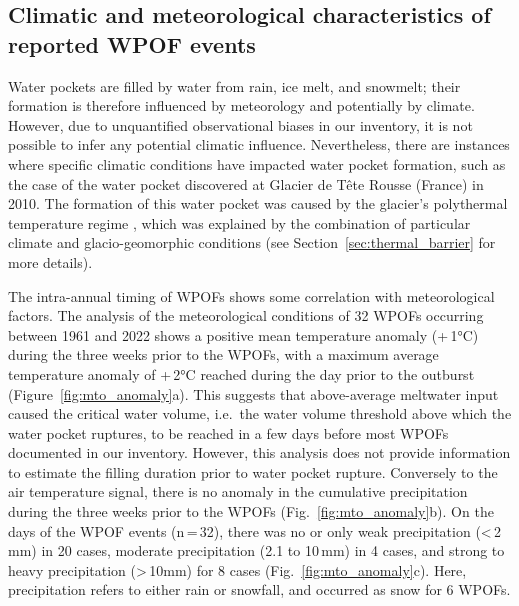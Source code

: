 \subsection{ Climatic and meteorological characteristics of reported WPOF events}
\label{sec:envelop_meteo}

Water pockets are filled by water from rain, ice melt, and snowmelt; their formation is therefore influenced by meteorology and potentially by climate. However, due to unquantified observational biases in our inventory, it is not possible to infer any potential climatic influence. Nevertheless, there are instances where specific climatic conditions have impacted water pocket formation, such as the case of the water pocket discovered at Glacier de Tête Rousse (France) in 2010. The formation of this water pocket was caused by the glacier's polythermal temperature regime \citep{Vincent&al2012}, which was explained by the combination of particular climate and glacio-geomorphic conditions (see Section~\ref{sec:thermal_barrier} for more details).

The intra-annual timing of WPOFs shows some correlation with meteorological factors. The analysis of the meteorological conditions of 32 WPOFs occurring between 1961 and 2022 shows a positive mean temperature anomaly (+\,1°C) during the three weeks prior to the WPOFs, with a maximum average temperature anomaly of +\,2°C reached during the day prior to the outburst (Figure~\ref{fig:mto_anomaly}a). This suggests that above-average meltwater input caused the critical water volume, i.e.\ the water volume threshold above which the water pocket ruptures, to be reached in a few days before most WPOFs documented in our inventory. However, this analysis does not provide information to estimate the filling duration prior to water pocket rupture. Conversely to the air temperature signal, there is no anomaly in the cumulative precipitation during the three weeks prior to the WPOFs (Fig.~\ref{fig:mto_anomaly}b). On the days of the WPOF events (n\,=\,32), there was no or only weak precipitation (<\,2\,mm) in  20 cases, moderate precipitation (2.1 to 10\,mm) in 4 cases, and strong to heavy precipitation (>\,10mm) for 8 cases (Fig.~\ref{fig:mto_anomaly}c). Here, precipitation refers to either rain or snowfall, and occurred as snow for 6 WPOFs. 



